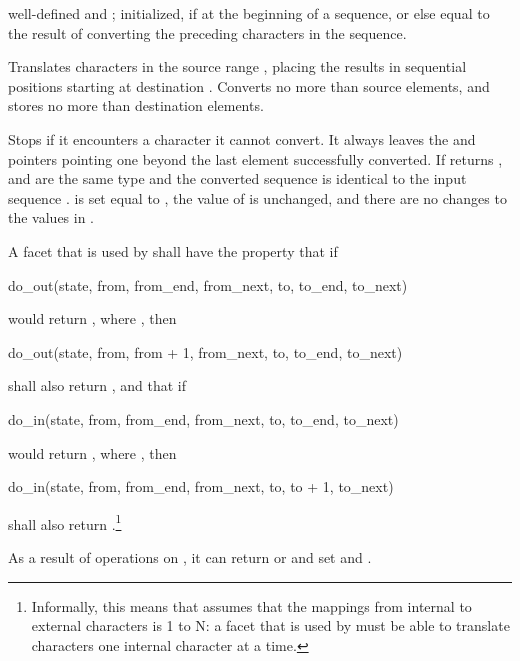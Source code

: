 \begin{itemdescr}
\pnum
\requires
{}
well-defined and
;
 initialized, if at the beginning of a sequence, or else equal to
the result of converting the preceding characters in the sequence.

\pnum
\effects
Translates characters in the source range
,
placing the results in sequential positions starting at destination .
Converts no more than
source elements, and
stores no more than
destination elements.

Stops if it encounters a character it cannot convert.
It always leaves the  and  pointers
pointing one beyond the last element successfully converted.
If returns
,
and
are the same type and the converted sequence is
identical to the input sequence
.
 is set equal to , the value of  is
unchanged, and there are no changes to the values in
.

\pnum
A
facet that is used by
 shall have the property that if
\begin{codeblock}
do_out(state, from, from_end, from_next, to, to_end, to_next)
\end{codeblock}
would return
,
where
,
then
\begin{codeblock}
do_out(state, from, from + 1, from_next, to, to_end, to_next)
\end{codeblock}
shall also return
,
and that if
\begin{codeblock}
do_in(state, from, from_end, from_next, to, to_end, to_next)
\end{codeblock}
would return
,
where
,
then
\begin{codeblock}
do_in(state, from, from_end, from_next, to, to + 1, to_next)
\end{codeblock}
shall also return
.\footnote{Informally, this means that
assumes that the mappings from internal to external characters is
1 to N: a
facet that is used by
must be able to translate characters one internal character at a time.
}
\begin{note} As a result of operations on , it can return  or  and set  and . \end{note}


\end{itemdescr}

